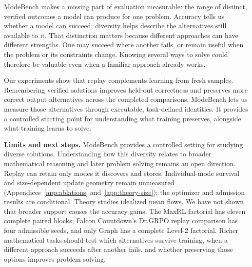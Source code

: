 ModeBench makes a missing part of evaluation measurable: the range of distinct,
verified outcomes a model can produce for one problem. Accuracy tells us whether
a model can succeed; diversity helps describe the alternatives still available
to it. That distinction matters because different approaches can have different
strengths. One may succeed where another fails, or remain useful when the
problem or its constraints change. Knowing several ways to solve could therefore
be valuable even when a familiar approach already works.

Our experiments show that replay complements learning from fresh samples.
Remembering verified solutions improves held-out correctness and preserves
more correct output alternatives across the completed comparisons. ModeBench
lets us measure those alternatives through executable, task-defined identities.
It provides a controlled starting point for understanding what training
preserves, alongside what training learns to solve.

\textbf{Limits and next steps.} ModeBench provides a controlled setting for
studying diverse solutions. Understanding how this diversity relates to broader
mathematical reasoning and later problem solving remains an open direction. Replay can
retain only modes it discovers and stores. Individual-mode survival and
size-dependent update geometry remain unmeasured
(Appendices~\ref{app:ablations} and~\ref{app:theory-size}); the optimizer and
admission results are conditional. Theory studies idealized mean flows.
We have not shown that broader support
causes the accuracy gains. The MaxRL factorial has eleven complete paired
blocks; Falcon Countdown's Dr.GRPO replay comparison has four admissible seeds,
and only Graph has a complete Level-2 factorial. Richer mathematical tasks
should test which alternatives survive training, when a different approach
succeeds after another fails, and whether preserving those options improves
problem solving.

